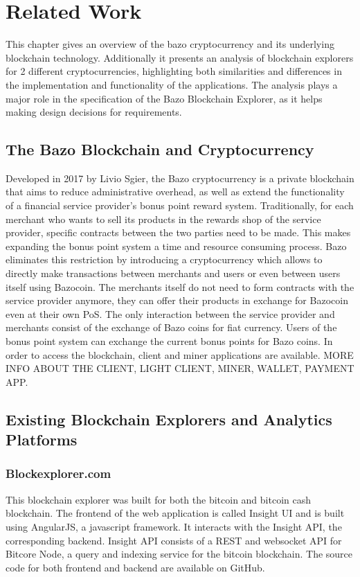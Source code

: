 \chapter{Related Work}
This chapter gives an overview of the bazo cryptocurrency and its underlying blockchain technology. Additionally it presents an analysis of blockchain explorers for 2 different cryptocurrencies, highlighting both similarities and differences in the implementation and functionality of the applications. The analysis plays a major role in the specification of the Bazo Blockchain Explorer, as it helps making design decisions for requirements.

\section{The Bazo Blockchain and Cryptocurrency}
Developed in 2017 by Livio Sgier, the Bazo cryptocurrency is a private blockchain that aims to reduce administrative overhead, as well as extend the functionality of a financial service provider's bonus point reward system. Traditionally, for each merchant who wants to sell its products in the rewards shop of the service provider, specific contracts between the two parties need to be made. This makes expanding the bonus point system a time and resource consuming process. Bazo eliminates this restriction by introducing a cryptocurrency which allows to directly make transactions between merchants and users or even between users itself using Bazocoin. The merchants itself do not need to form contracts with the service provider anymore, they can offer their products in exchange for Bazocoin even at their own PoS. The only interaction between the service provider and merchants consist of the exchange of Bazo coins for fiat currency. Users of the bonus point system can exchange the current bonus points for Bazo coins. In order to access the blockchain, client and miner applications are available. MORE INFO ABOUT THE CLIENT, LIGHT CLIENT, MINER, WALLET, PAYMENT APP.

\section{Existing Blockchain Explorers and Analytics Platforms}
\subsection{Blockexplorer.com}
This blockchain explorer was built for both the bitcoin and bitcoin cash blockchain. The frontend of the web application is called Insight UI and is built using AngularJS, a javascript framework. It interacts with the Insight API, the corresponding backend. Insight API consists of a REST and websocket API for Bitcore Node, a query and indexing service for the bitcoin blockchain. The source code for both frontend and backend are available on GitHub.

